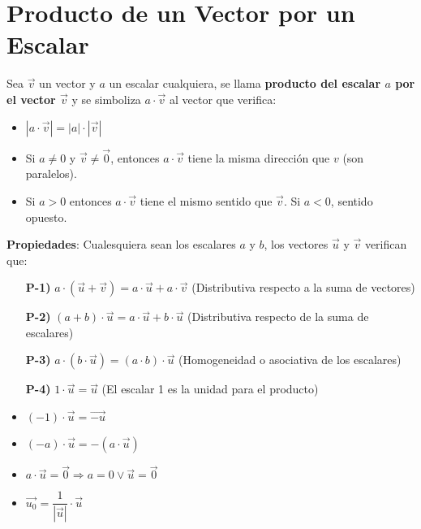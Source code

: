 \documentclass[11pt,a4paper]{article}
\begin{document}
\section{Producto de un Vector por un Escalar}
\noindent Sea $\overrightarrow{v}$ un vector y $a$ un escalar cualquiera, se llama \textbf{producto del escalar $a$ por el vector $\overrightarrow{v}$} y se simboliza $a\cdot \overrightarrow{v}$ al vector que verifica:
\begin{itemize}
\item $|a \cdot \overrightarrow{v}| = |a| \cdot |\overrightarrow{v}|$
\item Si $a\not=0$ y $\overrightarrow{v}\not=\overrightarrow{0}$, entonces $a\cdot\overrightarrow{v}$ tiene la misma direcci\'on que $v$ (son paralelos).
\item Si $a>0$ entonces $a\cdot\overrightarrow{v}$ tiene el mismo sentido que $\overrightarrow{v}$. Si $a<0$, sentido opuesto.
\end{itemize}
\noindent \textbf{Propiedades}: Cualesquiera sean los escalares $a$ y $b$, los vectores $\overrightarrow{u}$ y $\overrightarrow{v}$ verifican que:
\begin{itemize}
\item[\textbf{P-1)}] $a\cdot(\overrightarrow{u} + \overrightarrow{v}) = a\cdot\overrightarrow{u} + a\cdot\overrightarrow{v}$ (Distributiva respecto a la suma de vectores)
\item[\textbf{P-2)}] $(a+b)\cdot\overrightarrow{u} = a\cdot\overrightarrow{u} + b\cdot\overrightarrow{u}$ (Distributiva respecto de la suma de escalares)
\item[\textbf{P-3)}] $a\cdot(b\cdot\overrightarrow{u}) = (a\cdot b)\cdot\overrightarrow{u}$ (Homogeneidad o asociativa de los escalares)
\item[\textbf{P-4)}] $1\cdot\overrightarrow{u} = \overrightarrow{u}$ (El escalar 1 es la unidad para el producto)
\item $(-1)\cdot\overrightarrow{u} = \overrightarrow{-u}$
\item $(-a)\cdot\overrightarrow{u} = -(a\cdot\overrightarrow{u})$
\item $a\cdot\overrightarrow{u} = \overrightarrow{0} \Rightarrow a=0 \lor \overrightarrow{u}=\overrightarrow{0}$
\item $\overrightarrow{u_0} = \dfrac{1}{|\overrightarrow{u}|}\cdot\overrightarrow{u}$
\end{itemize}
\end{document}
